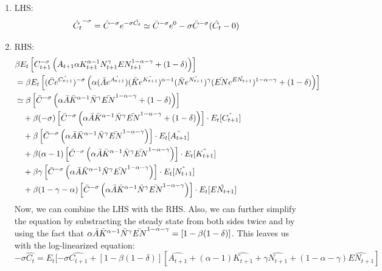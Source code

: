 \documentclass[a4paper,11pt]{article}
\begin{document}
\begin{enumerate}
    \item LHS:
    \begin{align*}
        & \hat{C_t}^{-\sigma} = \Bar{C}^{-\sigma}e^{-\sigma\hat{C_t}} \simeq  \Bar{C}^{-\sigma}e^{0} -\sigma\Bar{C}^{-\sigma}(\hat{C_t}-0)
    \end{align*}
    \item RHS:
    \begin{align*}
        & \beta E_t \left[ C_{t+1}^{-\sigma}\left(A_{t+1}\alpha K_{t+1}^{\alpha-1} N_{t+1}^\gamma EN_{t+1}^{1-\alpha-\gamma}+(1-\delta)\right)\right]\\
        & = \beta E_t \left[ (\Bar{C}e^{\hat{C_{t+1}}})^{-\sigma}\left(\alpha (\Bar{A}e^{\hat{A_{t+1}}}) (\Bar{K}e^{\hat{K_{t+1}}})^{\alpha-1} (\Bar{N}e^{\hat{N_{t+1}}})^\gamma (\Bar{EN}e^{\hat{EN_{t+1}}})^{1-\alpha-\gamma}+(1-\delta)\right)\right]\\
        &\simeq \beta \left[ \Bar{C}^{-\sigma}\left(\alpha \Bar{A} \Bar{K}^{\alpha-1} \Bar{N}^\gamma \Bar{EN}^{1-\alpha-\gamma}+(1-\delta)\right)\right]\\
        &\quad +  \beta(-\sigma) \left[ \Bar{C}^{-\sigma}\left(\alpha \Bar{A} \Bar{K}^{\alpha-1} \Bar{N}^\gamma \Bar{EN}^{1-\alpha-\gamma}+(1-\delta)\right)\right]\cdot E_t[\hat{C_{t+1}}]\\
        &\quad + \beta \left[ \Bar{C}^{-\sigma}\left(\alpha \Bar{A} \Bar{K}^{\alpha-1} \Bar{N}^\gamma \Bar{EN}^{1-\alpha-\gamma}\right)\right]\cdot E_t[\hat{A_{t+1}}]\\
        &\quad + \beta (\alpha - 1) \left[ \Bar{C}^{-\sigma}\left(\alpha \Bar{A} \Bar{K}^{\alpha-1} \Bar{N}^\gamma \Bar{EN}^{1-\alpha-\gamma}\right)\right]\cdot E_t[\hat{K_{t+1}}]\\
        &\quad + \beta \gamma \left[ \Bar{C}^{-\sigma}\left(\alpha \Bar{A} \Bar{K}^{\alpha-1} \Bar{N}^\gamma \Bar{EN}^{1-\alpha-\gamma}\right)\right]\cdot E_t[\hat{N_{t+1}}]\\
        &\quad + \beta (1-\gamma-\alpha) \left[ \Bar{C}^{-\sigma}\left(\alpha \Bar{A} \Bar{K}^{\alpha-1} \Bar{N}^\gamma \Bar{EN}^{1-\alpha-\gamma}\right)\right]\cdot E_t[\hat{EN_{t+1}}]\\
    \end{align*}
    Now, we can combine the LHS with the RHS. Also, we can further simplify the equation by substracting the steady state from both sides twice and by using the fact that $\alpha \Bar{A} \Bar{K}^{\alpha-1} \Bar{N}^\gamma \Bar{EN}^{1-\alpha-\gamma} = [1-\beta(1-\delta)]$. This leaves us with the log-linearized equation:
    $$-\sigma\hat{C_t} = E_t[-\sigma\hat{C_{t+1}}+[1-\beta(1-\delta)][\hat{A_{t+1}}+(\alpha-1)\hat{K_{t+1}}+\gamma \hat{N_{t+1}}+(1-\alpha-\gamma)\hat{EN_{t+1}}]$$
\end{enumerate}
\end{document}
